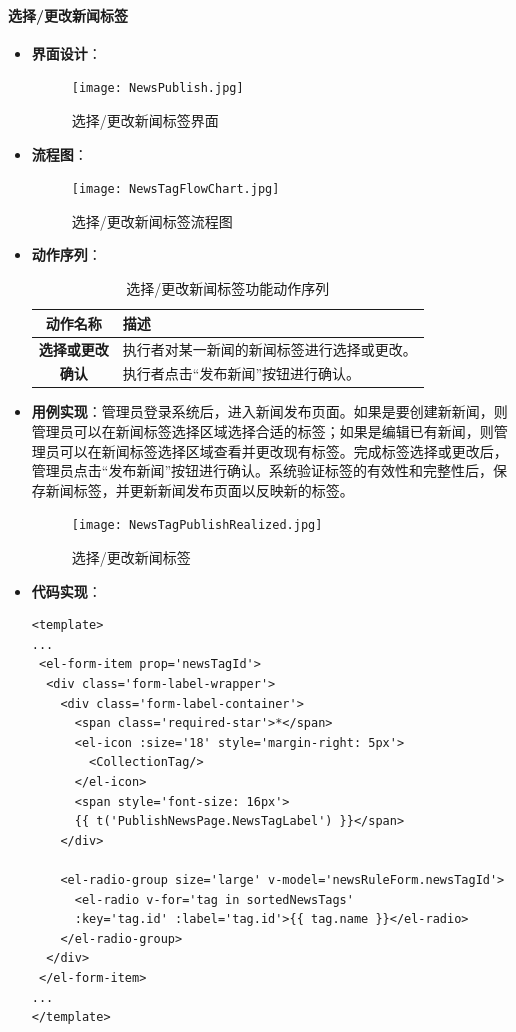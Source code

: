 \paragraph{选择/更改新闻标签}
\begin{itemize}
	\item \textbf{界面设计}：
	\begin{figure}[H]
		\centering
		\texttt{[image: NewsPublish.jpg]}
		\caption{选择/更改新闻标签界面}
		\label{NewsPublish}
	\end{figure}
	\item \textbf{流程图}：
	\begin{figure}[H]
		\centering
		\texttt{[image: NewsTagFlowChart.jpg]}
		\caption{选择/更改新闻标签流程图}
		\label{NewsTagFlowChart}
	\end{figure}
	\item \textbf{动作序列}：
	\begin{table}[H]
		\centering
		\caption{选择/更改新闻标签功能动作序列}
		\renewcommand\arraystretch{1.5}
		\begin{tabular}{|c|>{\raggedright\arraybackslash}p{10cm}|}
			\hline
			\textbf{动作名称} & \textbf{描述} \\ \hline
			\textbf{选择或更改} & 执行者对某一新闻的新闻标签进行选择或更改。 \\ \hline
			\textbf{确认} & 执行者点击“发布新闻”按钮进行确认。 \\ \hline
		\end{tabular}
	\end{table}
	\item \textbf{用例实现}：管理员登录系统后，进入新闻发布页面。如果是要创建新新闻，则管理员可以在新闻标签选择区域选择合适的标签；如果是编辑已有新闻，则管理员可以在新闻标签选择区域查看并更改现有标签。完成标签选择或更改后，管理员点击“发布新闻”按钮进行确认。系统验证标签的有效性和完整性后，保存新闻标签，并更新新闻发布页面以反映新的标签。
	\begin{figure}[H]
		\centering
		\texttt{[image: NewsTagPublishRealized.jpg]}
		\caption{选择/更改新闻标签}
		\label{NewsTagPublishRealized}
	\end{figure}
	\item \textbf{代码实现}：
	\begin{verbatim}
<template>
...
 <el-form-item prop='newsTagId'>
  <div class='form-label-wrapper'>
    <div class='form-label-container'>
      <span class='required-star'>*</span>
      <el-icon :size='18' style='margin-right: 5px'>
        <CollectionTag/>
      </el-icon>
      <span style='font-size: 16px'>
      {{ t('PublishNewsPage.NewsTagLabel') }}</span>
    </div>
	
    <el-radio-group size='large' v-model='newsRuleForm.newsTagId'>
      <el-radio v-for='tag in sortedNewsTags' 
      :key='tag.id' :label='tag.id'>{{ tag.name }}</el-radio>
    </el-radio-group>
  </div>
 </el-form-item>
...
</template>
	\end{verbatim}
\end{itemize}

